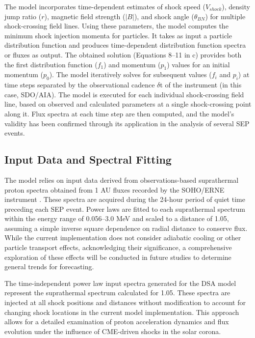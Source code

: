 The model incorporates time-dependent estimates of shock speed ($V_{shock}$), density jump ratio ($r$), magnetic field strength ($|B|$), and shock angle ($\theta_{BN}$) for multiple shock-crossing field lines. Using these parameters, the model computes the minimum shock injection momenta for particles. It takes as input a particle distribution function and produces time-dependent distribution function spectra or fluxes as output. The obtained solution (Equations 8–11 in c\citet{kozarev_2016}) provides both the first distribution function ($f_1$) and momentum ($p_1$) values for an initial momentum ($p_0$). The model iteratively solves for subsequent values ($f_i$ and $p_i$) at time steps separated by the observational cadence $\delta$t of the instrument (in this case, SDO/AIA). The model is executed for each individual shock-crossing field line, based on observed and calculated parameters at a single shock-crossing point along it. Flux spectra at each time step are then computed, and the model's validity has been confirmed through its application in the analysis of several SEP events.

\subsection{Input Data and Spectral Fitting}
The model relies on input data derived from observations-based suprathermal proton spectra obtained from 1 AU fluxes recorded by the SOHO/ERNE instrument \citep{torsti_1995}. These spectra are acquired during the 24-hour period of quiet time preceding each SEP event. Power laws are fitted to each suprathermal spectrum within the energy range of 0.056–3.0 MeV and scaled to a distance of 1.05\rsun, assuming a simple inverse square dependence on radial distance to conserve flux. While the current implementation does not consider adiabatic cooling or other particle transport effects, acknowledging their significance, a comprehensive exploration of these effects will be conducted in future studies to determine general trends for forecasting.

The time-independent power law input spectra generated for the DSA model represent the suprathermal spectrum calculated for 1.05\rsun. These spectra are injected at all shock positions and distances without modification to account for changing shock locations in the current model implementation. This approach allows for a detailed examination of proton acceleration dynamics and flux evolution under the influence of CME-driven shocks in the solar corona.

